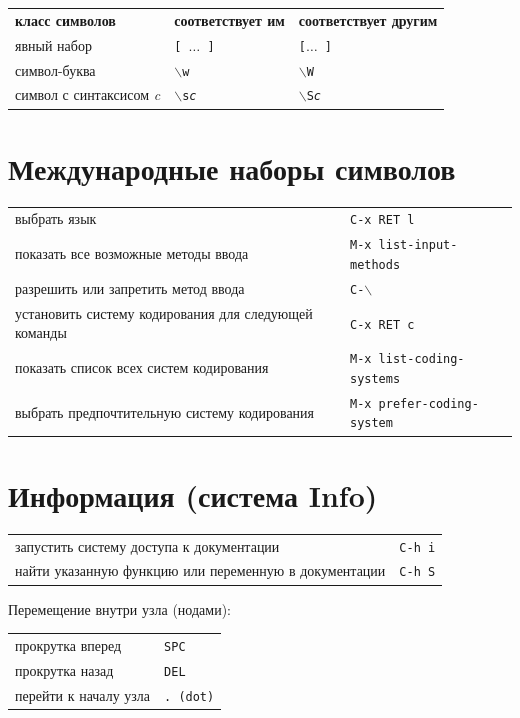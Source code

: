 \documentclass[10pt]{article}
\newlength{\ColWidth}
\newlength{\ColThreeWidth}
\newcommand{\kbd}[1]{\texttt{#1}}
\begin{document}
\begin{tabular}{p{\ColWidth}p{\ColThreeWidth}p{\ColThreeWidth}}
{\bf класс символов} & {\bf соответ\-ствует им} & {\bf соответ\-ствует другим} \\
явный набор & \kbd{[ {\rm$\ldots$} ]} & \kbd{[\^ {\rm$\ldots$} ]} \\
символ-буква & \kbd{$\backslash$w} & \kbd{$\backslash$W} \\
символ с синтаксисом {\it c} & \kbd{$\backslash$s{\it c}} & \kbd{$\backslash$S{\it c}} \\
\end{tabular}

\section{Международные наборы символов}

\begin{tabular}{p{\ColWidth}l}
выбрать язык & \kbd{C-x RET l} \\
показать все возможные методы ввода & \kbd{M-x list-input-methods} \\
разрешить или запретить метод ввода & \kbd{C-$\backslash$} \\
установить систему кодирования для следующей команды & \kbd{C-x RET c} \\
показать список всех систем кодирования & \kbd{M-x list-coding-systems} \\
выбрать предпочтительную систему кодирования & \kbd{M-x prefer-coding-system} \\
\end{tabular}

\section{Информация (система Info)}

\begin{tabular}{p{\ColWidth}l}
запустить систему доступа к документации & \kbd{C-h i} \\
найти указанную функцию или переменную в документации & \kbd{C-h S} \\
\end{tabular}

Перемещение внутри узла (нодами):

\begin{tabular}{p{\ColWidth}l}
прокрутка вперед & \kbd{SPC} \\
прокрутка назад & \kbd{DEL} \\
перейти к началу узла & \kbd{. {\rm (dot)}} \\
\end{tabular}
\end{document}
